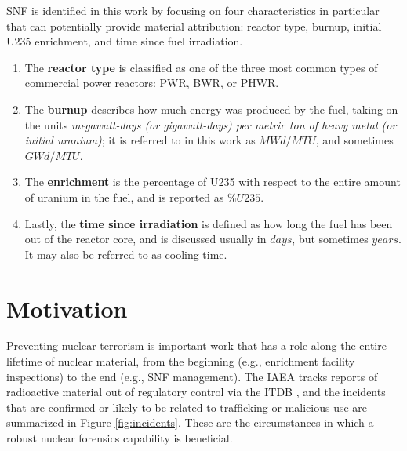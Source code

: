 \gls{SNF} is identified in this work by focusing on four characteristics in
particular that can potentially provide material attribution: reactor type,
burnup, initial \gls{U235} enrichment, and time since fuel irradiation. 
\begin{enumerate}
  \item The \textbf{reactor type} is classified as one of the three most common
  types of commercial power reactors: \gls{PWR}, \gls{BWR}, or \gls{PHWR}.
  \item The \textbf{burnup} describes how much energy was produced by the fuel,
  taking on the units \textit{megawatt-days (or gigawatt-days) per metric ton
  of heavy metal (or initial uranium)}; it is referred to in this work as
  $MWd/MTU$, and sometimes $GWd/MTU$.  
  \item The \textbf{enrichment} is the percentage of \gls{U235} with respect to
  the entire amount of uranium in the fuel, and is reported as $\%U235$. 
  \item Lastly, the \textbf{time since irradiation} is defined as how long the
  fuel has been out of the reactor core, and is discussed usually in $days$,
  but sometimes $years$. It may also be referred to as cooling time. 
\end{enumerate}

\section{Motivation}
\label{sec:motivation}

Preventing nuclear terrorism is important work that has a role along the entire
lifetime of nuclear material, from the beginning (e.g., enrichment facility
inspections) to the end (e.g., \gls{SNF} management). The \gls{IAEA} tracks
reports of radioactive material out of regulatory control via the \gls{ITDB}
\cite{itdb}, and the incidents that are confirmed or likely to be related to
trafficking or malicious use are summarized in Figure \ref{fig:incidents}.
These are the circumstances in which a robust nuclear forensics capability is
beneficial.

